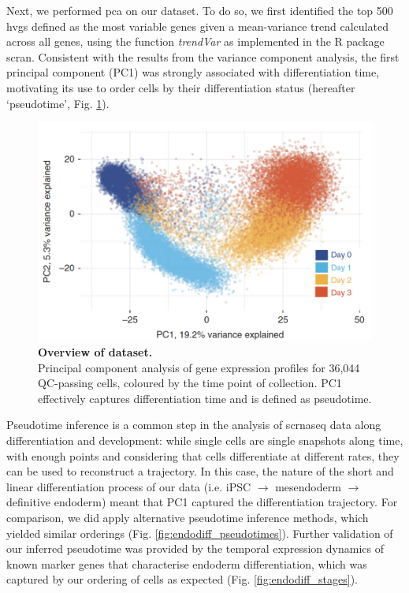 Next, we performed \gls{pca} on our dataset.
To do so, we first identified the top 500 \gls{hvgs} defined as the most variable genes given a mean-variance trend calculated across all genes, using the function \textit{trendVar} as implemented in the R package scran.
Consistent with the results from the variance component analysis, the first principal component (PC1) was strongly associated with differentiation time, motivating its use to order cells by their differentiation status (hereafter `pseudotime', Fig. \ref{fig:endodiff_pca}).\\

\begin{figure}[h]
\centering
\includegraphics[width=14cm]{Chapter4/Fig/endodiff_pca_overview.png}
\caption[Overview of dataset.]{\textbf{Overview of dataset.}\\
Principal component analysis of gene expression profiles for 36,044 QC-passing
cells, coloured by the time point of collection.
PC1 effectively captures differentiation time and is defined as pseudotime.}
\label{fig:endodiff_pca}
\end{figure}

Pseudotime inference is a common step in the analysis of \gls{scrnaseq} data along differentiation and development: while single cells are single snapshots along time, with enough points and considering that cells differentiate at different rates, they can be used to reconstruct a trajectory.
In this case, the nature of the short and linear differentiation process of our data (i.e. iPSC $\rightarrow$ mesendoderm $\rightarrow$ definitive endoderm) meant that PC1 captured the differentiation trajectory.
For comparison, we did apply alternative pseudotime inference methods, which yielded similar orderings (Fig. \ref{fig:endodiff_pseudotimes}).
Further validation of our inferred pseudotime was provided by the temporal expression dynamics of known marker genes that characterise endoderm differentiation, which was captured by our ordering of cells as expected (Fig. \ref{fig:endodiff_stages}).

